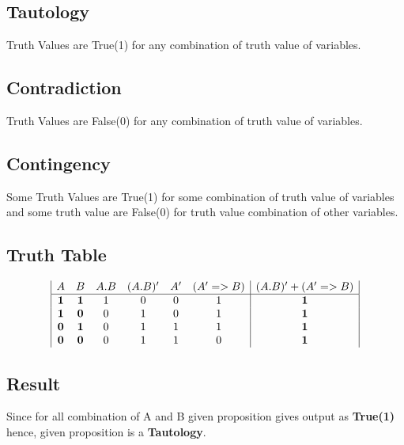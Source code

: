 \documentclass{article}
\begin{document}
\subsection{Tautology}
Truth Values are True(1) for any combination of truth value of variables.

\subsection{Contradiction}
Truth Values are False(0) for any combination of truth value of variables.

\subsection{Contingency}
Some Truth Values are True(1) for some combination of truth value of variables and some truth value are False(0) for  truth value combination of other variables.


\subsection{Truth Table}
\begin{displaymath}
\begin{array}{|c c c c c c|c|}
A & B & A . B & (A . B)' &  A' & (A' => B ) &  (A . B)'+( A' => B) \\ %
\hline %
\textbf{1} & \textbf{1} & 1 & 0 & 0 & 1 & \textbf{1}\\
\textbf{1} & \textbf{0} & 0 & 1 & 0 & 1 & \textbf{1}\\
\textbf{0} & \textbf{1} & 0 & 1 & 1 & 1 & \textbf{1}\\
\textbf{0} & \textbf{0} & 0 & 1 & 1 & 0 & \textbf{1}\\
\end{array}
\end{displaymath}

\subsection{Result}
Since for all combination of A and B given proposition gives output as \textbf{True(1)} hence, given proposition is a \textbf{Tautology}. 
\end{document}
